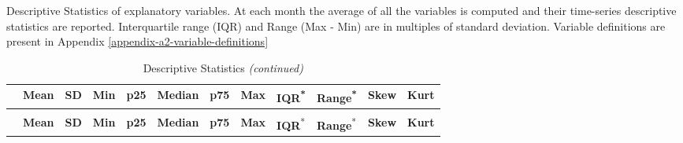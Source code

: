 
\begin{landscape}\begingroup\fontsize{9}{11}\selectfont

\begin{ThreePartTable}
\begin{TableNotes}
\item Descriptive Statistics of explanatory variables. At each month the average of all the variables is computed and their time-series descriptive statistics are reported. Interquartile range (IQR) and Range (Max - Min) are in multiples of standard deviation. Variable definitions are present in Appendix \ref{appendix-a2-variable-definitions}
\end{TableNotes}
\begin{longtable}[t]{>{\raggedright\arraybackslash}p{3.3cm}>{\raggedleft\arraybackslash}p{1.2cm}>{\raggedleft\arraybackslash}p{1.2cm}>{\raggedleft\arraybackslash}p{1.2cm}>{\raggedleft\arraybackslash}p{1.2cm}>{\raggedleft\arraybackslash}p{1.2cm}>{\raggedleft\arraybackslash}p{1.2cm}>{\raggedleft\arraybackslash}p{1.2cm}>{\raggedleft\arraybackslash}p{1.2cm}>{\raggedleft\arraybackslash}p{1.2cm}>{\raggedleft\arraybackslash}p{1.2cm}>{\raggedleft\arraybackslash}p{1.2cm}}
\caption[Descriptive Statistics]{\label{tab:summary_stat}Descriptive Statistics}\\
\toprule
  & \textbf{Mean} & \textbf{SD} & \textbf{Min} & \textbf{p25} & \textbf{Median} & \textbf{p75} & \textbf{Max} & \textbf{IQR}\textsuperscript{*} & \textbf{Range}\textsuperscript{*} & \textbf{Skew} & \textbf{Kurt}\\
\midrule
\endfirsthead
\caption[]{Descriptive Statistics \textit{(continued)}}\\
\toprule
  & \textbf{Mean} & \textbf{SD} & \textbf{Min} & \textbf{p25} & \textbf{Median} & \textbf{p75} & \textbf{Max} & \textbf{IQR}\textsuperscript{*} & \textbf{Range}\textsuperscript{*} & \textbf{Skew} & \textbf{Kurt}\\
\midrule
\endhead


\end{longtable}
\end{ThreePartTable}
\end{landscape}

